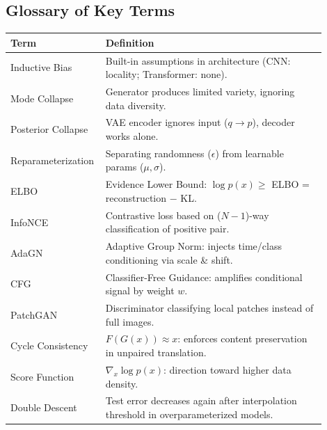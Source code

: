 \subsection{Glossary of Key Terms}
\begin{center}\small
\begin{tabular}{p{0.22\linewidth}p{0.68\linewidth}}\toprule
\textbf{Term} & \textbf{Definition} \\\midrule
Inductive Bias & Built-in assumptions in architecture (CNN: locality; Transformer: none). \\
Mode Collapse & Generator produces limited variety, ignoring data diversity. \\
Posterior Collapse & VAE encoder ignores input ($q \to p$), decoder works alone. \\
Reparameterization & Separating randomness ($\epsilon$) from learnable params ($\mu, \sigma$). \\
ELBO & Evidence Lower Bound: $\log p(x) \geq$ ELBO = reconstruction $-$ KL. \\
InfoNCE & Contrastive loss based on ($N-1$)-way classification of positive pair. \\
AdaGN & Adaptive Group Norm: injects time/class conditioning via scale \& shift. \\
CFG & Classifier-Free Guidance: amplifies conditional signal by weight $w$. \\
PatchGAN & Discriminator classifying local patches instead of full images. \\
Cycle Consistency & $F(G(x)) \approx x$: enforces content preservation in unpaired translation. \\
Score Function & $\nabla_x \log p(x)$: direction toward higher data density. \\
Double Descent & Test error decreases again after interpolation threshold in overparameterized models. \\
\bottomrule
\end{tabular}
\end{center}

\printindex
